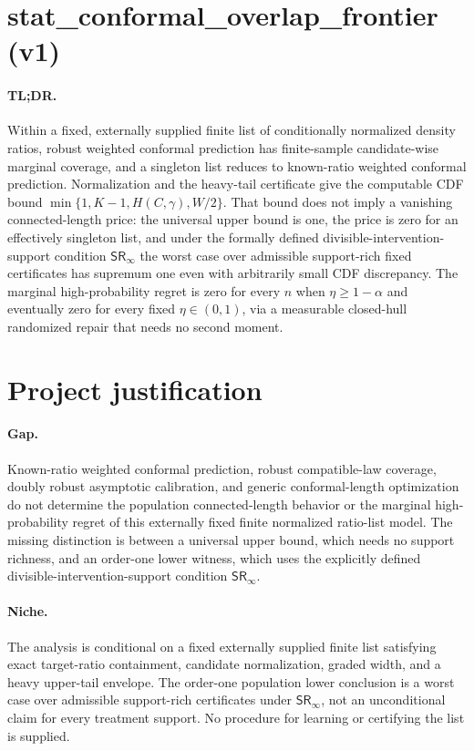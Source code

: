 \documentclass{article}
\begin{document}
\section*{stat\_conformal\_overlap\_frontier (v1)}

\paragraph{TL;DR.} Within a fixed, externally supplied finite list of conditionally normalized density ratios, robust weighted conformal prediction has finite-sample candidate-wise marginal coverage, and a singleton list reduces to known-ratio weighted conformal prediction. Normalization and the heavy-tail certificate give the computable CDF bound \(\min\{1,K-1,H(C,\gamma),W/2\}\). That bound does not imply a vanishing connected-length price: the universal upper bound is one, the price is zero for an effectively singleton list, and under the formally defined divisible-intervention-support condition \(\mathsf{SR}_\infty\) the worst case over admissible support-rich fixed certificates has supremum one even with arbitrarily small CDF discrepancy. The marginal high-probability regret is zero for every \(n\) when \(\eta\ge1-\alpha\) and eventually zero for every fixed \(\eta\in(0,1)\), via a measurable closed-hull randomized repair that needs no second moment.

\section{Project justification}

\paragraph{Gap.} Known-ratio weighted conformal prediction, robust compatible-law coverage, doubly robust asymptotic calibration, and generic conformal-length optimization do not determine the population connected-length behavior or the marginal high-probability regret of this externally fixed finite normalized ratio-list model. The missing distinction is between a universal upper bound, which needs no support richness, and an order-one lower witness, which uses the explicitly defined divisible-intervention-support condition \(\mathsf{SR}_\infty\).

\paragraph{Niche.} The analysis is conditional on a fixed externally supplied finite list satisfying exact target-ratio containment, candidate normalization, graded width, and a heavy upper-tail envelope. The order-one population lower conclusion is a worst case over admissible support-rich certificates under \(\mathsf{SR}_\infty\), not an unconditional claim for every treatment support. No procedure for learning or certifying the list is supplied.
\end{document}
